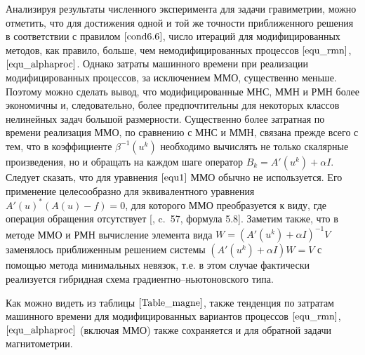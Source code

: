 Анализируя результаты численного эксперимента для задачи гравиметрии, можно отметить, что для достижения одной и той же точности приближенного решения в соответствии с правилом $\eqref{cond6.6}$, число итераций для модифицированных методов, как правило, больше, чем немодифицированных процессов $\eqref{equ_rmn}$, $\eqref{equ_alphaproc}$. Однако затраты машинного времени при реализации модифицированных процессов, за исключением ММО, существенно меньше. Поэтому можно сделать вывод, что модифицированные МНС, ММН и РМН более экономичны и, следовательно, более предпочтительны для некоторых классов нелинейных задач большой размерности. Существенно более затратная по времени реализация ММО, по сравнению с МНС и ММН, связана прежде всего с тем, что в коэффициенте $\beta^{-1}(u^k)$ необходимо вычислять не только скалярные произведения, но и обращать на каждом шаге оператор $B_k=A'(u^k)+\alpha I$. Следует сказать, что для уравнения $\eqref{equ1}$ ММО обычно не используется. Его применение целесообразно для эквивалентного уравнения $A'(u)^*(A(u)-f)=0$, для которого ММО преобразуется к виду, где операция обращения отсутствует [\cite{VasEre2009},	c.~57, формула 5.8]. Заметим также, что в методе ММО и РМН вычисление элемента вида $W=(A'(u^k)+\alpha I)^{-1}V$ заменялось приближенным решением системы $(A'(u^k)+\alpha I)W=V$ с помощью метода минимальных невязок, т.е. в этом случае фактически реализуется гибридная схема градиентно--ньютоновского типа. 

Как можно видеть из таблицы $\ref{Table_magne}$, также тенденция по затратам машинного времени для модифицированных вариантов процессов $\eqref{equ_rmn}$, $\eqref{equ_alphaproc}$ (включая ММО) также сохраняется и для обратной задачи магнитометрии. 


